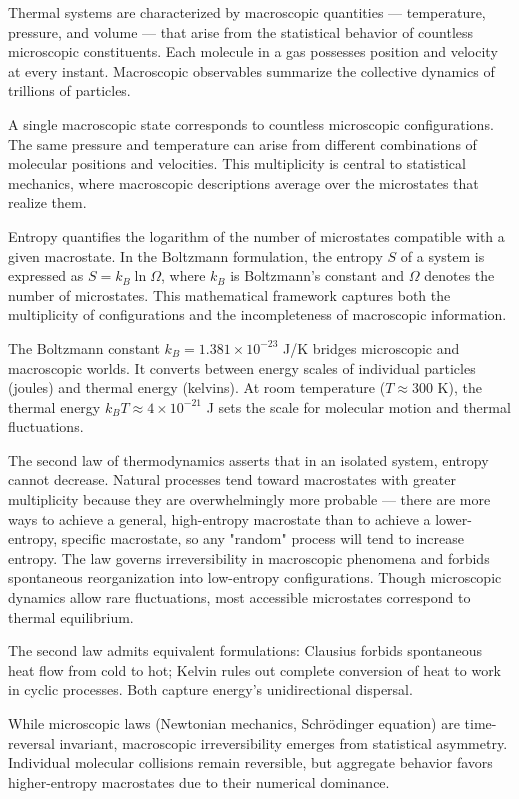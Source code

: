 Thermal systems are characterized by macroscopic quantities — temperature, pressure, and volume — that arise from the statistical behavior of countless microscopic constituents. Each molecule in a gas possesses position and velocity at every instant. Macroscopic observables summarize the collective dynamics of trillions of particles.

A single macroscopic state corresponds to countless microscopic configurations. The same pressure and temperature can arise from different combinations of molecular positions and velocities. This multiplicity is central to statistical mechanics, where macroscopic descriptions average over the microstates that realize them.

Entropy quantifies the logarithm of the number of microstates compatible with a given macrostate. In the Boltzmann formulation, the entropy $S$ of a system is expressed as $S = k_B \ln \Omega$, where $k_B$ is Boltzmann's constant and $\Omega$ denotes the number of microstates. This mathematical framework captures both the multiplicity of configurations and the incompleteness of macroscopic information.

The Boltzmann constant $k_B = 1.381 \times 10^{-23}$ J/K bridges microscopic and macroscopic worlds. It converts between energy scales of individual particles (joules) and thermal energy (kelvins). At room temperature ($T \approx 300$ K), the thermal energy $k_B T \approx 4 \times 10^{-21}$ J sets the scale for molecular motion and thermal fluctuations.

The second law of thermodynamics asserts that in an isolated system, entropy cannot decrease. Natural processes tend toward macrostates with greater multiplicity because they are overwhelmingly more probable — there are more ways to achieve a general, high-entropy macrostate than to achieve a lower-entropy, specific macrostate, so any "random" process will tend to increase entropy. The law governs irreversibility in macroscopic phenomena and forbids spontaneous reorganization into low-entropy configurations. Though microscopic dynamics allow rare fluctuations, most accessible microstates correspond to thermal equilibrium.

The second law admits equivalent formulations: Clausius forbids spontaneous heat flow from cold to hot; Kelvin rules out complete conversion of heat to work in cyclic processes. Both capture energy's unidirectional dispersal.

While microscopic laws (Newtonian mechanics, Schrödinger equation) are time-reversal invariant, macroscopic irreversibility emerges from statistical asymmetry. Individual molecular collisions remain reversible, but aggregate behavior favors higher-entropy macrostates due to their numerical dominance.

